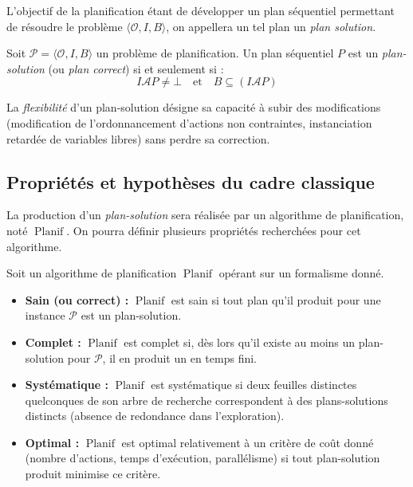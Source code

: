 L'objectif de la planification étant de développer un plan séquentiel permettant de résoudre le problème $ \langle \mathcal{O}, I, B \rangle$, on appellera un tel plan un \emph{plan solution}.

\begin{definition}
    Soit $\mathcal{P} = \langle \mathcal{O}, I, B \rangle$ un problème de planification. Un plan séquentiel $P$ est un \emph{plan-solution} (ou \emph{plan correct}) si et seulement si :
    \begin{equation}
        I \mathcal{A} P \neq \bot \quad \text{et} \quad B \subseteq (I \mathcal{A} P)
    \end{equation}
\end{definition}

\begin{remark}[Flexibilité]
    La \emph{flexibilité} d'un plan-solution désigne sa capacité à subir des modifications (modification de l'ordonnancement d'actions non contraintes, instanciation retardée de variables libres) sans perdre sa correction.
\end{remark}

\subsection{Propriétés et hypothèses du cadre classique}

La production d'un \emph{plan-solution} sera réalisée par un algorithme de planification, noté $ \operatorname{Planif}$. On pourra définir plusieurs propriétés recherchées pour cet algorithme. 

\begin{prop}[Planificateur]
    Soit un algorithme de planification $\operatorname{Planif}$ opérant sur un formalisme donné.
    \begin{itemize}
        \item \textbf{Sain (ou correct) :} $\operatorname{Planif}$ est sain si tout plan qu'il produit pour une instance $\mathcal{P}$ est un plan-solution.
        \item \textbf{Complet :} $\operatorname{Planif}$ est complet si, dès lors qu'il existe au moins un plan-solution pour $\mathcal{P}$, il en produit un en temps fini.
        \item \textbf{Systématique :} $\operatorname{Planif}$ est systématique si deux feuilles distinctes quelconques de son arbre de recherche correspondent à des plans-solutions distincts (absence de redondance dans l'exploration).
        \item \textbf{Optimal :} $\operatorname{Planif}$ est optimal relativement à un critère de coût donné (nombre d'actions, temps d'exécution, parallélisme) si tout plan-solution produit minimise ce critère.
    \end{itemize}
\end{prop} 

